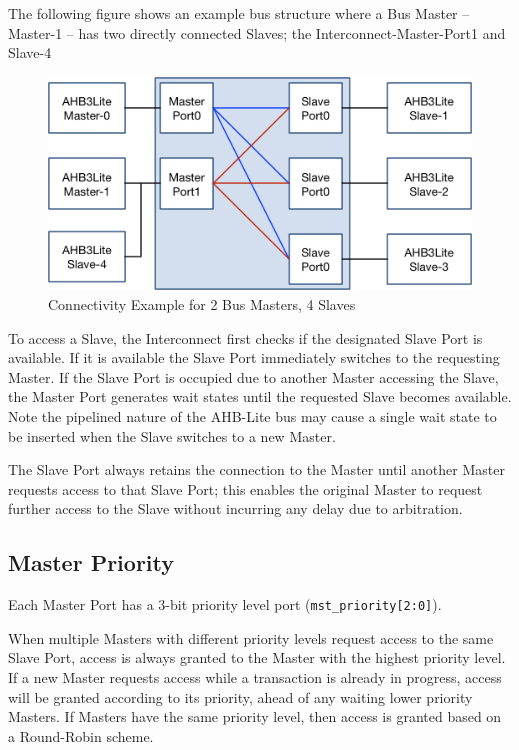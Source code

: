 The following figure shows an example bus structure where a Bus Master -- Master-1
-- has two directly connected Slaves; the Interconnect-Master-Port1 and
Slave-4

\begin{figure}[tbh]
	\includegraphics{assets/img/ahb-lite-switch-sys2.png}
	\caption{Connectivity Example for 2 Bus Masters, 4 Slaves}
	\label{fig:ahb-lite-switch-sys2}
\end{figure}

To access a Slave, the Interconnect first checks if the designated Slave
Port is available. If it is available the Slave Port immediately
switches to the requesting Master. If the Slave Port is occupied due to
another Master accessing the Slave, the Master Port generates wait
states until the requested Slave becomes available. Note the pipelined
nature of the AHB-Lite bus may cause a single wait state to be inserted
when the Slave switches to a new Master.

The Slave Port always retains the connection to the Master until another
Master requests access to that Slave Port; this enables the original
Master to request further access to the Slave without incurring any
delay due to arbitration.

\subsection{Master Priority}\label{master-priority}

Each Master Port has a 3-bit priority level port
(\texttt{mst\_priority[2:0]}).

When multiple Masters with different priority levels request access to
the same Slave Port, access is always granted to the Master with the
highest priority level. If a new Master requests access while a
transaction is already in progress, access will be granted according to
its priority, ahead of any waiting lower priority Masters. If Masters
have the same priority level, then access is granted based on a
Round-Robin scheme.

